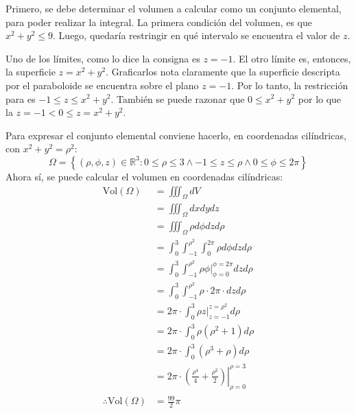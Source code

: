 \begin{solution}
    Primero, se debe determinar el volumen a calcular como un conjunto elemental, para poder
    realizar la integral. La primera condición del volumen, es que $x^2+y^2 \leq 9$. Luego, quedaría restringir
    en qué intervalo se encuentra el valor de $z$.
    
    Uno de los límites, como lo dice la consigna es $z=-1$.
    El otro límite es, entonces, la superficie $z=x^2+y^2$. Graficarlos nota claramente que la superficie
    descripta por el paraboloide se encuentra sobre el plano $z=-1$. Por lo tanto, la restricción para es
    $-1\leq z \leq x^2+y^2$. También se puede razonar que $0\leq x^2+y^2$ por lo que la $z=-1 < 0 \leq z=x^2+y^2$.

    Para expresar el conjunto elemental conviene hacerlo, en coordenadas cilíndricas, con $x^2+y^2=\rho^2$:
    \begin{equation*}
        \Omega = \left\{(\rho,\phi,z) \in \mathbb{R}^3 : 0\leq\rho\leq 3 \land -1\leq z \leq \rho \land 0\leq\phi\leq 2\pi \right\}
    \end{equation*}
    Ahora sí, se puede calcular el volumen en coordenadas cilíndricas:
    \begin{align*}
        \text{Vol}(\Omega)&=\iiint_\Omega dV\\
        &=\iiint_\Omega dxdydz\\
        &=\iiint_\Omega \rho d\phi dz d\rho\\
        &= \int_0^3 \int_{-1}^{\rho^2} \int_0^{2\pi} \rho d\phi dz d\rho\\
        &= \int_0^3 \int_{-1}^{\rho^2} \rho \left.\phi\right|_{\phi=0}^{\phi=2\pi} dz d\rho\\
        &= \int_0^3 \int_{-1}^{\rho^2} \rho \cdot 2\pi \cdot dz d\rho\\
        &= 2\pi \cdot \int_0^3 \rho \left.z\right|_{z=-1}^{z=\rho^2} d\rho\\
        &= 2\pi \cdot \int_0^3 \rho \left(\rho^2+1\right) d\rho\\
        &= 2\pi \cdot \int_0^3 \left(\rho^3+\rho\right) d\rho\\
        &= 2\pi \cdot \left.\left(\frac{\rho^4}{4}+\frac{\rho^2}{2}\right)\right|_{\rho=0}^{\rho=3}\\
        \therefore\text{Vol}(\Omega)&= \frac{99}{2}\pi
    \end{align*}

\end{solution}

